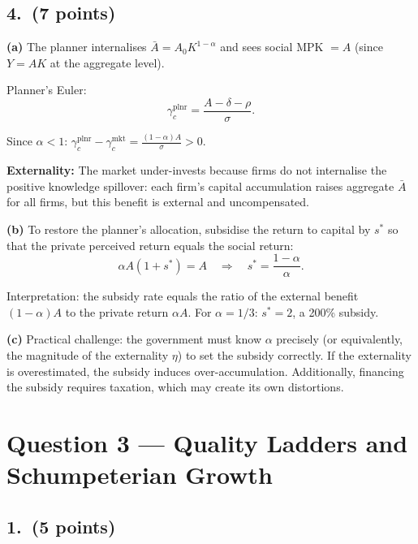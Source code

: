 \documentclass[a4paper,11pt]{article}
\begin{document}
\subsection*{4.\ (7 points)}

\begin{answerbox}
\textbf{(a)} The planner internalises $\bar{A} = A_0 K^{1-\alpha}$ and sees social MPK $= A$
(since $Y = AK$ at the aggregate level).

Planner's Euler:
\[
    \gamma_c^{\mathrm{plnr}} = \frac{A - \delta - \rho}{\sigma}.
\]

Since $\alpha < 1$: $\gamma_c^{\mathrm{plnr}} - \gamma_c^{\mathrm{mkt}}
= \frac{(1-\alpha)A}{\sigma} > 0$.

\textbf{Externality:} The market under-invests because firms do not internalise the
positive knowledge spillover: each firm's capital accumulation raises aggregate $\bar{A}$
for all firms, but this benefit is external and uncompensated.

\textbf{(b)} To restore the planner's allocation, subsidise the return to capital by $s^*$
so that the private perceived return equals the social return:
\[
    \alpha A(1 + s^*) = A \quad\Longrightarrow\quad
    \boxed{s^* = \frac{1-\alpha}{\alpha}.}
\]

Interpretation: the subsidy rate equals the ratio of the external benefit $(1-\alpha)A$ to
the private return $\alpha A$.  For $\alpha = 1/3$: $s^* = 2$, a 200\% subsidy.

\textbf{(c)} Practical challenge: the government must know $\alpha$ precisely (or
equivalently, the magnitude of the externality $\eta$) to set the subsidy correctly.  If
the externality is overestimated, the subsidy induces over-accumulation.  Additionally,
financing the subsidy requires taxation, which may create its own distortions.
\end{answerbox}

\clearpage
\section{Question 3 --- Quality Ladders and Schumpeterian Growth}

\subsection*{1.\ (5 points)}
\end{document}
